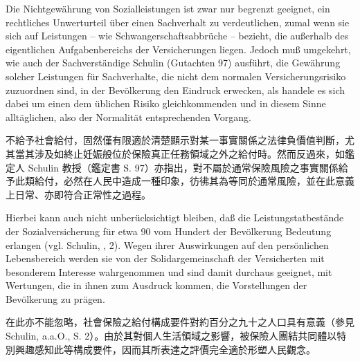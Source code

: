 \documentclass[12pt]{article}
\begin{document}
\begin{sourcepara}[title={原文E.214}]
Die Nichtgewährung von Sozialleistungen ist zwar nur begrenzt geeignet, ein rechtliches Unwerturteil über einen Sachverhalt zu verdeutlichen, zumal wenn sie sich auf Leistungen -- wie Schwangerschaftsabbrüche -- bezieht, die außerhalb des eigentlichen Aufgabenbereichs der Versicherungen liegen. Jedoch muß umgekehrt, wie auch der Sachverständige \abbrProf{} \abbrDr{} Schulin (Gutachten \abbrS{} 97) ausführt, die Gewährung solcher Leistungen für Sachverhalte, die nicht dem normalen Versicherungsrisiko zuzuordnen sind, in der Bevölkerung den Eindruck erwecken, als handele es sich dabei um einen dem üblichen Risiko gleichkommenden und in diesem Sinne alltäglichen, also der Normalität entsprechenden Vorgang.
\end{sourcepara}
\begin{transpara}
不給予社會給付，固然僅有限適於清楚顯示對某一事實關係之法律負價值判斷，尤其當其涉及如終止妊娠般位於保險真正任務領域之外之給付時。然而反過來，如鑑定人 Schulin 教授（鑑定書 S. 97）亦指出，對不屬於通常保險風險之事實關係給予此類給付，必然在人民中造成一種印象，彷彿其為等同於通常風險，並在此意義上日常、亦即符合正常性之過程。
\end{transpara}

\begin{sourcepara}[title={原文E.215}]
Hierbei kann auch nicht unberücksichtigt bleiben, daß die Leistungstatbestände der Sozialversicherung für etwa 90 vom Hundert der Bevölkerung Bedeutung erlangen (vgl. Schulin, \abbrAAO{}, \abbrS{} 2). Wegen ihrer Auswirkungen auf den persönlichen Lebensbereich werden sie von der Solidargemeinschaft der Versicherten mit besonderem Interesse wahrgenommen und sind damit durchaus geeignet, mit Wertungen, die in ihnen zum Ausdruck kommen, die Vorstellungen der Bevölkerung zu prägen.
\end{sourcepara}
\begin{transpara}
在此亦不能忽略，社會保險之給付構成要件對約百分之九十之人口具有意義（參見 Schulin, a.a.O., S. 2）。由於其對個人生活領域之影響，被保險人團結共同體以特別興趣感知此等構成要件，因而其所表達之評價完全適於形塑人民觀念。
\end{transpara}
\end{document}
